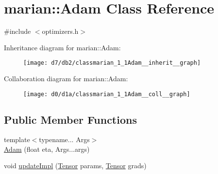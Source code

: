 \hypertarget{classmarian_1_1Adam}{}\section{marian\+:\+:Adam Class Reference}
\label{classmarian_1_1Adam}


{\ttfamily \#include $<$optimizers.\+h$>$}



Inheritance diagram for marian\+:\+:Adam\+:
\nopagebreak
\begin{figure}[H]
\begin{center}
\leavevmode
\texttt{[image: d7/db2/classmarian\_1\_1Adam\_\_inherit\_\_graph]}
\end{center}
\end{figure}


Collaboration diagram for marian\+:\+:Adam\+:
\nopagebreak
\begin{figure}[H]
\begin{center}
\leavevmode
\texttt{[image: d0/d1a/classmarian\_1\_1Adam\_\_coll\_\_graph]}
\end{center}
\end{figure}
\subsection*{Public Member Functions}
\begin{DoxyCompactItemize}
\item 
{\footnotesize template$<$typename... Args$>$ }\\\hyperlink{classmarian_1_1Adam_a80f76d2db32e227f2879f4ed654505a7}{Adam} (float eta, Args...\+args)
\item 
void \hyperlink{classmarian_1_1Adam_a8134d893e68d1be18ea2cdcc98994f56}{update\+Impl} (\hyperlink{namespacemarian_a88b71ec34bb354564cddc24eb80f7e14}{Tensor} params, \hyperlink{namespacemarian_a88b71ec34bb354564cddc24eb80f7e14}{Tensor} grads)
\end{DoxyCompactItemize}
